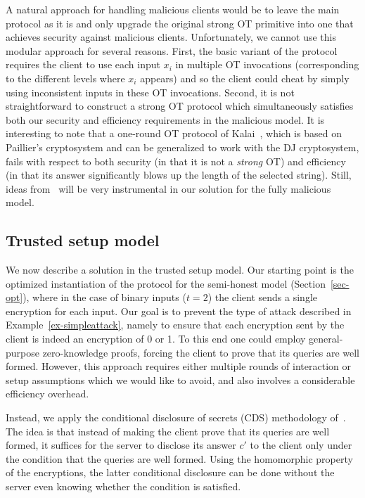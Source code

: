 \documentclass[11pt]{article}
\begin{document}
A natural approach for handling malicious clients would be to leave
the main protocol as it is and only upgrade the original strong OT
primitive into one that achieves security against malicious clients.
Unfortunately, we cannot use this modular approach for several
reasons. First, the basic variant of the protocol requires the client
to use each input $x_i$ in multiple OT invocations (corresponding to
the different levels where $x_i$ appears) and so the client could
cheat by simply using inconsistent inputs in these OT invocations.
Second, it is not straightforward to construct a strong OT protocol
which simultaneously satisfies both our security and efficiency
requirements in the malicious model. It is interesting to note that
a one-round OT protocol of Kalai~\cite{T05}, which is based on
Paillier's cryptosystem and can be generalized to work with the DJ
cryptosystem, fails with respect to both security (in that it is
not a {\em strong} OT) and efficiency (in that its answer
significantly blows up the length of the selected string). Still,
ideas from~\cite{T05} will be very instrumental in our solution for
the fully malicious model.



\subsection{Trusted setup model}
\label{sec-trusted}

We now describe a solution in the trusted setup model. Our starting
point is the optimized instantiation of the protocol for the
semi-honest model (Section~\ref{sec-opt}), where in the case of
binary inputs ($t=2$) the client sends a single encryption for each
input. Our goal is to prevent the type of attack described in
Example~\ref{ex-simpleattack}, namely to ensure that each
encryption sent by the client is indeed an encryption of 0 or 1. To
this end one could employ general-purpose zero-knowledge proofs,
forcing the client to prove that its queries are well formed.
However, this approach requires either multiple rounds of
interaction or setup assumptions which we would like to avoid, and
also involves a considerable efficiency overhead.

Instead, we apply the conditional disclosure of secrets (CDS)
methodology of~\cite{GIKM,AIR01}. The idea is that instead of
making the client prove that its queries are well formed, it
suffices for the server to disclose its answer $c'$ to the client
only under the condition that the queries are well formed. Using
the homomorphic property of the encryptions, the latter conditional
disclosure can be done without the server even knowing whether the
condition is satisfied.
\end{document}
